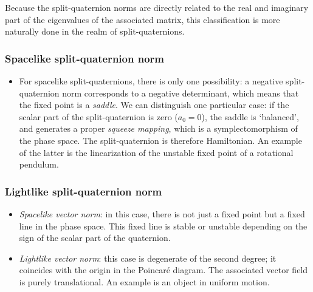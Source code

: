 Because the split-quaternion norms are directly related to the real and imaginary part of the eigenvalues of the associated matrix, this classification is more naturally done in the realm of split-quaternions.

\subsubsection*{Spacelike split-quaternion norm}
    \begin{itemize}
        \item[\circled{1}] For spacelike split-quaternions, there is only one possibility: a negative split-quaternion norm corresponds to a negative determinant, which means that the fixed point is a \emph{saddle}. We can distinguish one particular case: if the scalar part of the split-quaternion is zero ($a_0 = 0$), the saddle is `balanced', and generates a proper \emph{squeeze mapping}, which is a symplectomorphism of the phase space. The split-quaternion is therefore Hamiltonian. An example of the latter is the linearization of the unstable fixed point of a rotational pendulum.
    \end{itemize}

\subsubsection*{Lightlike split-quaternion norm}
    \begin{itemize}
        \item[\circled{2}] \emph{Spacelike vector norm}: in this case, there is not just a fixed point but a fixed line in the phase space. This fixed line is stable or unstable depending on the sign of the scalar part of the quaternion. 
        \item[\circled{3}] \emph{Lightlike vector norm}: this case is degenerate of the second degree; it coincides with the origin in the Poincaré diagram. The associated vector field is purely translational. An example is an object in uniform motion.
    \end{itemize}
